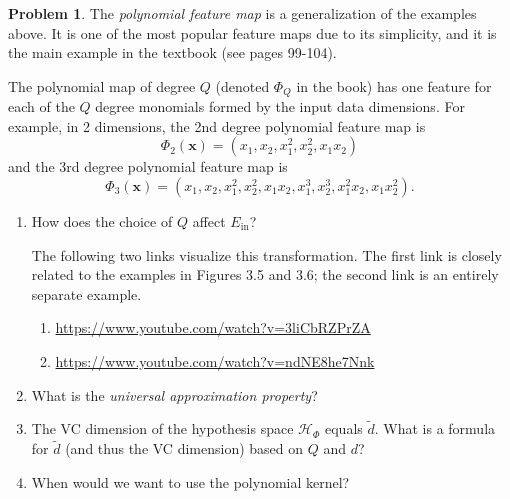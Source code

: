 \documentclass[10pt]{exam}
\theoremstyle{definition}
\newtheorem{problem}{Problem}
\newcommand{\Ein}{E_{\text{in}}}
\newcommand{\x}{\mathbf x}
\newcommand{\HH}[1]{\mathcal H_{\text{#1}}}
\begin{document}
\begin{problem}
    The \emph{polynomial feature map} is a generalization of the examples above.
    It is one of the most popular feature maps due to its simplicity,
    and it is the main example in the textbook (see pages 99-104).

    The polynomial map of degree $Q$ (denoted $\Phi_Q$ in the book) has one feature for each of the $Q$ degree monomials formed by the input data dimensions.
    For example, in 2 dimensions, the 2nd degree polynomial feature map is
    \begin{equation}
        \Phi_2(\x) = (x_1, x_2, x_1^2, x_2^2, x_1x_2)
    \end{equation}
    and the 3rd degree polynomial feature map is
    \begin{equation}
        \Phi_3(\x) = (x_1, x_2, x_1^2, x_2^2, x_1x_2, x_1^3, x_2^3, x_1^2x_2, x_1x_2^2)
        .
    \end{equation}

    \begin{enumerate}
        \item
            How does the choice of $Q$ affect $\Ein$?
            \vspace{6in}

        The following two links visualize this transformation.
        The first link is closely related to the examples in Figures 3.5 and 3.6;
            the second link is an entirely separate example.
        \begin{enumerate}
            \item \url{https://www.youtube.com/watch?v=3liCbRZPrZA}
            \item \url{https://www.youtube.com/watch?v=ndNE8he7Nnk}
        \end{enumerate}

        \item
            What is the \emph{universal approximation property}?
            \vspace{3in}

            \newpage
        \item
        The VC dimension of the hypothesis space $\HH{$\Phi$}$ equals $	\tilde d$.
        What is a formula for $	\tilde d$ (and thus the VC dimension) based on $Q$ and $d$?
            \vspace{4in}


        \item
        When would we want to use the polynomial kernel?
    \end{enumerate}
\end{problem}
\end{document}
